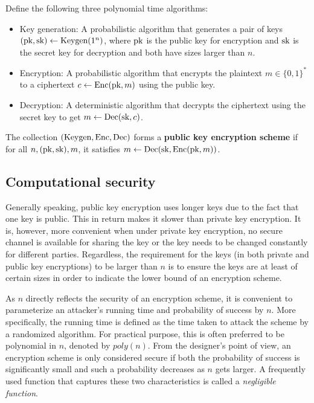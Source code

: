 \documentclass[../main.tex]{subfiles}
\begin{document}
\begin{definition}
	Define the following three polynomial time algorithms: 
	\begin{itemize}
		\item Key generation: A probabilistic algorithm that generates a pair of keys $(\text{pk},\text{sk}) \leftarrow \text{Keygen}(1^n)$, where $\text{pk}$ is the public key for encryption and $\text{sk}$ is the secret key for decryption and both have sizes larger than $n$.  
		\item Encryption: A probabilistic algorithm that encrypts the plaintext $m \in \{0, 1\}^*$ to a ciphertext $c \leftarrow \text{Enc}(\text{pk}, m)$ using the public key.
		\item Decryption: A deterministic algorithm that decrypts the ciphertext using the secret key to get $m \leftarrow \text{Dec}(\text{sk},c)$.
	\end{itemize} 
	The collection $(\text{Keygen}, \text{Enc}, \text{Dec})$ forms a \textbf{public key encryption scheme}  if for all $n, (\text{pk},\text{sk}), m$, it satisfies $m \leftarrow \text{Dec}(\text{sk},\text{Enc}(\text{pk},m))$. 
\end{definition}

\subsection{Computational security}
Generally speaking, public key encryption uses longer keys due to the fact that one key is public. This in return makes it slower than private key encryption. It is, however, more convenient when under private key encryption, no secure channel is available for sharing the key or the key needs to be changed constantly for different parties. Regardless, the requirement for the keys (in both private and public key encryptions) to be larger than $n$ is to ensure the keys are at least of certain sizes in order to indicate the lower bound of an encryption scheme.  

As $n$ directly reflects the security of an encryption scheme, it is convenient to parameterize an attacker's running time and probability of success by $n$. More specifically, the running time is defined as the time taken to attack the scheme by a randomized algorithm. For practical purpose, this is often preferred to be polynomial in $n$, denoted by $poly(n)$. From the designer's point of view, an encryption scheme is only considered secure if both the probability of success is significantly small and such a probability decreases as $n$ gets larger. A frequently used function that captures these two characteristics is called a \textit{negligible function}. 
\end{document}
